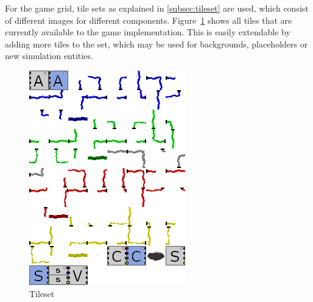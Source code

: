 For the game grid, tile sets as explained in \ref{subsec:tileset} are used, which consist of different images for different components.
Figure~\ref{fig:tileset} shows all tiles that are currently available to the game implementation.
This is easily extendable by adding more tiles to the set, which may be used for backgrounds, placeholders or new simulation entities.
\begin{figure}
    \centering
    \includegraphics[width=\textwidth]{Pictures/res/implementation/tileset}
    \caption{Tileset}
    \label{fig:tileset}
\end{figure}

